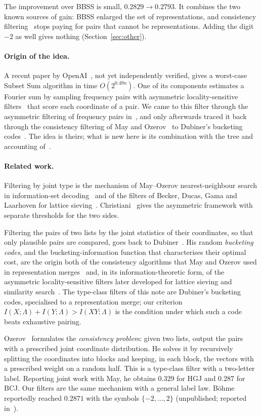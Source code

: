 \documentclass[11pt]{article}
\theoremstyle{definition}
\theoremstyle{remark}
\begin{document}
The improvement over BBSS is small, $0.2829\to0.2793$. It combines the two known sources of gain: BBSS enlarged the
set of representations, and consistency filtering~\cite{Oze16} stops paying for pairs that cannot be
representations. Adding the digit $-2$ as well gives nothing (Section~\ref{sec:other}).

\paragraph{Origin of the idea.} A recent paper by OpenAI~\cite{OAI26}, not yet independently verified, gives a
worst-case Subset Sum algorithm in time $O(2^{0.49n})$. One of its components estimates a Fourier sum by sampling
frequency pairs with asymmetric locality-sensitive filters~\cite{Chr17} that score each coordinate of a pair. We came to this filter through the asymmetric filtering of frequency pairs
in~\cite{OAI26}, and only afterwards traced it back through the consistency filtering of May and
Ozerov~\cite{Oze16} to Dubiner's bucketing codes~\cite{Dub10}. The idea is theirs; what is new here is its
combination with the tree and accounting of~\cite{BBSS20}.

\paragraph{Related work.} Filtering by joint type is the mechanism of May--Ozerov nearest-neighbour search in
information-set decoding~\cite{MO15} and of the filters of Becker, Ducas, Gama and Laarhoven for lattice
sieving~\cite{BDGL16}. Christiani~\cite{Chr17} gives the asymmetric framework with separate thresholds for the two
sides.

Filtering the pairs of two lists by the joint statistics of their coordinates, so that only plausible pairs are
compared, goes back to Dubiner~\cite{Dub10}. His random \emph{bucketing codes}, and the bucketing-information function
that characterises their optimal cost, are the origin both of the consistency algorithms that May and Ozerov used in
representation merges~\cite{Oze16} and, in its information-theoretic form, of the asymmetric locality-sensitive
filters later developed for lattice sieving and similarity search~\cite{BDGL16,Chr17}. The type-class filters of this
note are Dubiner's bucketing codes, specialised to a representation merge; our criterion
$I(X;\Lambda)+I(Y;\Lambda)>I(XY;\Lambda)$ is the condition under which such a code beats exhaustive pairing.

Ozerov~\cite[\S2.2, \S5.1]{Oze16} formulates the \emph{consistency problem}: given two lists, output the pairs with a
prescribed joint coordinate distribution. He solves it by recursively splitting the coordinates into blocks and
keeping, in each block, the vectors with a prescribed weight on a random half. This is a type-class filter with a
two-letter label. Reporting joint work with May, he obtains $0.329$ for HGJ and $0.287$ for BCJ. Our filters are the
same mechanism with a general label law. Böhme~\cite{Boh11} reportedly reached $0.2871$ with the symbols
$\{-2,\dots,2\}$ (unpublished; reported in~\cite[fn.~5]{BBSS20}).
\end{document}
